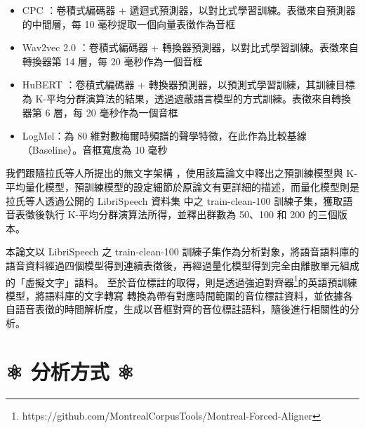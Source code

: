 {\begin{itemize}
    \item CPC \cite{rivière2020unsupervised}：卷積式編碼器 + 遞迴式預測器，以對比式學習訓練。表徵來自預測器的中間層，每 10 毫秒提取一個向量表徵作為音框
    \item Wav2vec 2.0 \cite{baevski2020wav2vec}：卷積式編碼器 + 轉換器預測器，以對比式學習訓練。表徵來自轉換器第 14 層，每 20 毫秒作為一個音框
    \item HuBERT \cite{hsu_hubert_2021-2}：卷積式編碼器 + 轉換器預測器，以預測式學習訓練，其訓練目標為 K-平均分群演算法的結果，透過遮蔽語言模型的方式訓練。表徵來自轉換器第 6 層，每 20 毫秒作為一個音框
    \item LogMel：為 80 維對數梅爾時頻譜的聲學特徵，在此作為比較基線（Baseline）。音框寬度為 10 毫秒
\end{itemize}

        我們跟隨拉氏等人所提出的無文字架構 \cite{lakhotia_generative_2021-1} ，使用該篇論文中釋出之預訓練模型與 K-平均量化模型，預訓練模型的設定細節於原論文有更詳細的描述，而量化模型則是拉氏等人透過公開的 LibriSpeech 資料集 \cite{panayotov_librispeech_2015} 中之 train-clean-100 訓練子集，獲取語音表徵後執行 K-平均分群演算法所得，並釋出群數為 50、100 和 200 的三個版本。

        本論文以 LibriSpeech 之 train-clean-100 訓練子集作為分析對象，將語音語料庫的語音資料經過四個模型得到連續表徵後，再經過量化模型得到完全由離散單元組成的「虛擬文字」語料。
        至於音位標註的取得，則是透過強迫對齊器\footnote{https://github.com/MontrealCorpusTools/Montreal-Forced-Aligner}的英語預訓練模型，將語料庫的文字轉寫
        轉換為帶有對應時間範圍的音位標註資料，並依據各自語音表徵的時間解析度，生成以音框對齊的音位標註語料，隨後進行相關性的分析。



}  %

\section{⚛️ 分析方式 ⚛️}

